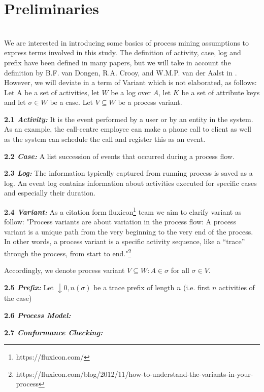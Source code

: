 \clearpage
\chapter{Preliminaries}
\\ 

We are interested in introducing some basics of process mining assumptions to express terms involved in this study.
The definition of activity, case, log and prefix have been defined in many papers, but we will take in account the definition by B.F. van Dongen, R.A. Crooy, and W.M.P. van der Aalst in \cite{cycletimeprediction}.
However, we will deviate in a term of Variant which is not elaborated, as follows:
\\

Let A be a set of activities, let $W$ be a log over $A$, let $K$ be a set of attribute keys and let $ \sigma \in W$ be a case. Let $V  \subseteq W $ be a process variant.

\textbf{2.1\textit{ Activity:}} 
It is the event performed by a user or by an entity in the system. As an example, the call-centre employee can make a phone call to client as well as the system can schedule the call and register this as an event.

\textbf{2.2\textit{ Case:}} 
A list succession of events that occurred during
a process flow.

\textbf{2.3\textit{ Log:}}   
The information typically captured from running process is saved as a log. An event log contains information about activities executed for specific cases and especially their duration.

\textbf{2.4\textit{ Variant:}}  As a citation form fluxicon\footnote{ https://fluxicon.com/} team we aim to clarify variant as follow: "Process variants are about variation in the process flow: A process variant is a unique path from the very beginning to the very end of the process. In other words, a process variant is a specific activity sequence, like a “trace” through the process, from start to end."\footnote{ https://fluxicon.com/blog/2012/11/how-to-understand-the-variants-in-your-process}

Accordingly, we denote process variant $V \subseteq W: A \in \sigma $ for all $\sigma \in V$.

\textbf{2.5\textit{ Prefix:}}  Let $\downarrow 0,n (\sigma)$ be a trace prefix of length $n$ (i.e. first $n$ activities of the case)


\textbf{2.6\textit{ Process Model:}}

\textbf{2.7\textit{ Conformance Checking:}}